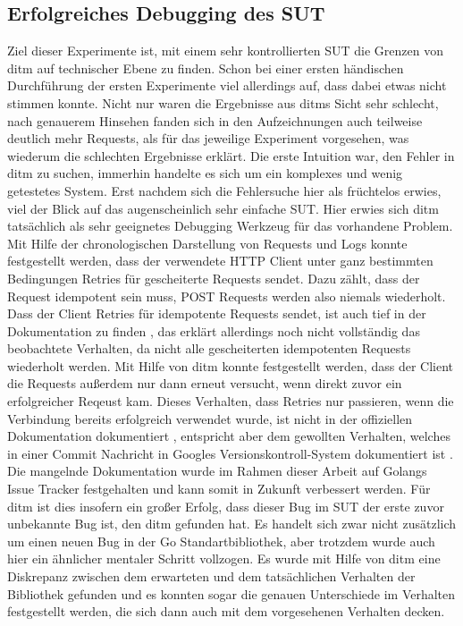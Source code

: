 \documentclass[a4paper]{report}
\begin{document}
\subsection{Erfolgreiches Debugging des SUT}
Ziel dieser Experimente ist, mit einem sehr kontrollierten SUT die Grenzen von ditm auf technischer Ebene zu finden.
Schon bei einer ersten händischen Durchführung der ersten Experimente viel allerdings auf, dass dabei etwas nicht stimmen konnte.
Nicht nur waren die Ergebnisse aus ditms Sicht sehr schlecht, nach genauerem Hinsehen fanden sich in den Aufzeichnungen auch
teilweise deutlich mehr Requests, als für das jeweilige Experiment vorgesehen, was wiederum die schlechten Ergebnisse erklärt.
Die erste Intuition war, den Fehler in ditm zu suchen, immerhin handelte es sich um ein komplexes und wenig getestetes System.
Erst nachdem sich die Fehlersuche hier als früchtelos erwies, viel der Blick auf das augenscheinlich sehr einfache SUT.
Hier erwies sich ditm tatsächlich als sehr geeignetes Debugging Werkzeug für das vorhandene Problem. Mit Hilfe der chronologischen
Darstellung von Requests und Logs konnte festgestellt werden, dass der verwendete HTTP Client unter ganz bestimmten Bedingungen
Retries für gescheiterte Requests sendet. Dazu zählt, dass der Request idempotent sein muss, POST Requests werden also niemals
wiederholt. Dass der Client Retries für idempotente Requests sendet, ist auch tief in der Dokumentation zu finden \cite{go_transport_docs},
das erklärt allerdings noch nicht vollständig das beobachtete Verhalten, da nicht alle gescheiterten idempotenten Requests wiederholt werden.
Mit Hilfe von ditm konnte festgestellt werden, dass der Client die Requests außerdem nur dann erneut versucht, wenn direkt zuvor
ein erfolgreicher Reqeust kam. Dieses Verhalten, dass Retries nur passieren, wenn die Verbindung bereits erfolgreich verwendet wurde,
ist nicht in der offiziellen Dokumentation dokumentiert \cite{go_transport_docs}, entspricht aber dem gewollten Verhalten, welches in
einer Commit Nachricht in Googles Versionskontroll-System dokumentiert ist \cite{go_retry_commit}. Die mangelnde Dokumentation
wurde im Rahmen dieser Arbeit auf Golangs Issue Tracker festgehalten und kann somit in Zukunft verbessert werden.
Für ditm ist dies insofern ein großer Erfolg, dass dieser Bug im SUT der erste zuvor unbekannte Bug ist, den ditm gefunden hat.
Es handelt sich zwar nicht zusätzlich um einen neuen Bug in der Go Standartbibliothek, aber trotzdem wurde auch hier ein
ähnlicher mentaler Schritt vollzogen. Es wurde mit Hilfe von ditm eine Diskrepanz zwischen dem erwarteten und dem tatsächlichen
Verhalten der Bibliothek gefunden und es konnten sogar die genauen Unterschiede im Verhalten festgestellt werden, die sich dann auch
mit dem vorgesehenen Verhalten decken.
\end{document}
